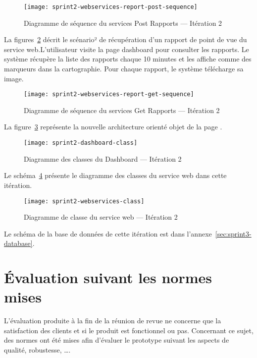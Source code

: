 \begin{figure}[H]
    \centering
    \texttt{[image: sprint2-webservices-report-post-sequence]}
    \caption{Diagramme de séquence du services Post Rapports --- Itération 2}
\label{fig:sprint2-webservices-report-post-sequence}
\end{figure}

La figures~\ref{fig:sprint2-webservices-report-get-sequence} décrit le
scénario² de récupération d'un rapport de point de vue du service
web.L'utilisateur visite la page dashboard pour consulter les rapports.  Le
système récupère la liste des rapports chaque 10 minutes et les affiche comme
des marqueurs dans la cartographie.  Pour chaque rapport, le système télécharge
sa image.

\begin{figure}[H]
    \centering
    \texttt{[image: sprint2-webservices-report-get-sequence]}
    \caption{Diagramme de séquence du services Get Rapports --- Itération 2}
\label{fig:sprint2-webservices-report-get-sequence}
\end{figure}

La figure~\ref{fig:sprint2-dashboard-class} représente la nouvelle architecture
orienté objet de la page .

\begin{figure}[H]
    \centering
    \texttt{[image: sprint2-dashboard-class]}
    \caption{Diagramme des classes du Dashboard --- Itération 2}
\label{fig:sprint2-dashboard-class}
\end{figure}

Le schéma~\ref{fig:sprint2-webservices-class} présente le diagramme des classes
du service web dans cette itération.

\begin{figure}[H]
    \centering
    \texttt{[image: sprint2-webservices-class]}
    \caption{Diagramme de classe du service web --- Itération 2}
\label{fig:sprint2-webservices-class}
\end{figure}

Le schéma de la base de données de cette itération est dans
l'annexe~\ref{sec:sprint3-database}.

\section{Évaluation suivant les normes mises}

L'évaluation produite à la fin de la réunion de revue ne concerne que la
satisfaction des clients et si le produit est fonctionnel ou pas. Concernant ce
sujet, des normes ont été mises afin d'évaluer le prototype suivant les aspects
de qualité, robustesse, \ldots.

